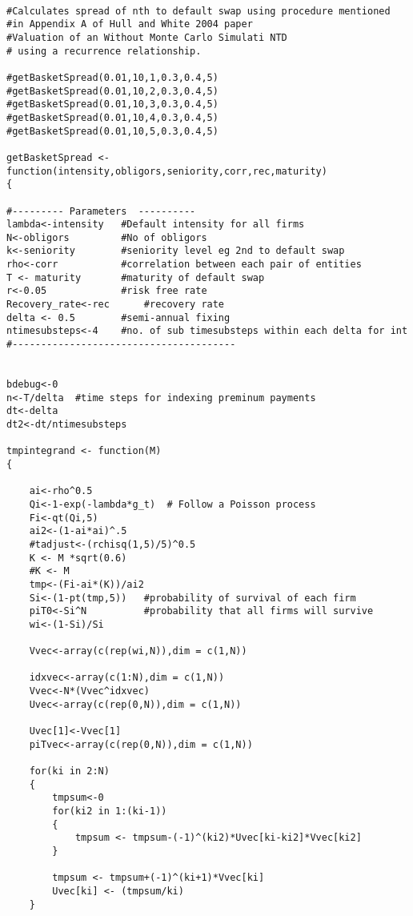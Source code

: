 \begin{singlespace}
\begin{lstlisting}

#Calculates spread of nth to default swap using procedure mentioned  
#in Appendix A of Hull and White 2004 paper 
#Valuation of an Without Monte Carlo Simulati NTD
# using a recurrence relationship.

#getBasketSpread(0.01,10,1,0.3,0.4,5)
#getBasketSpread(0.01,10,2,0.3,0.4,5)
#getBasketSpread(0.01,10,3,0.3,0.4,5)
#getBasketSpread(0.01,10,4,0.3,0.4,5)
#getBasketSpread(0.01,10,5,0.3,0.4,5)

getBasketSpread <- function(intensity,obligors,seniority,corr,rec,maturity)
{

#--------- Parameters  ---------- 
lambda<-intensity  	#Default intensity for all firms 
N<-obligors  		#No of obligors 
k<-seniority  		#seniority level eg 2nd to default swap 
rho<-corr  			#correlation between each pair of entities 
T <- maturity  		#maturity of default swap 
r<-0.05  			#risk free rate  
Recovery_rate<-rec  	#recovery rate 
delta <- 0.5  		#semi-annual fixing 
ntimesubsteps<-4  	#no. of sub timesubsteps within each delta for int 
#---------------------------------------   


bdebug<-0  
n<-T/delta  #time steps for indexing preminum payments 
dt<-delta  
dt2<-dt/ntimesubsteps   

tmpintegrand <- function(M) 	
{

	ai<-rho^0.5  	
	Qi<-1-exp(-lambda*g_t)	# Follow a Poisson process
	Fi<-qt(Qi,5)  	
	ai2<-(1-ai*ai)^.5  
	#tadjust<-(rchisq(1,5)/5)^0.5
	K <- M *sqrt(0.6)
	#K <- M
	tmp<-(Fi-ai*(K))/ai2  	
	Si<-(1-pt(tmp,5))  	#probability of survival of each firm 	
	piT0<-Si^N  		#probability that all firms will survive 
	wi<-(1-Si)/Si
	 	
	Vvec<-array(c(rep(wi,N)),dim = c(1,N))

	idxvec<-array(c(1:N),dim = c(1,N))
	Vvec<-N*(Vvec^idxvec)  	
	Uvec<-array(c(rep(0,N)),dim = c(1,N))

	Uvec[1]<-Vvec[1]  	
	piTvec<-array(c(rep(0,N)),dim = c(1,N))  	

	for(ki in 2:N)
	{ 		
		tmpsum<-0  		
		for(ki2 in 1:(ki-1)) 	
		{		
			tmpsum <- tmpsum-(-1)^(ki2)*Uvec[ki-ki2]*Vvec[ki2]
		}
	
		tmpsum <- tmpsum+(-1)^(ki+1)*Vvec[ki]	
		Uvec[ki] <- (tmpsum/ki)
	}


\end{lstlisting}
\end{singlespace}
